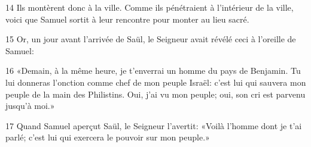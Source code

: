 

14 Ils montèrent donc à la ville. Comme ils pénétraient à l’intérieur de la ville, voici que Samuel sortit à leur rencontre pour monter au lieu sacré.

15 Or, un jour avant l’arrivée de Saül, le Seigneur avait révélé ceci à l’oreille de Samuel:

16 «Demain, à la même heure, je t’enverrai un homme du pays de Benjamin. Tu lui donneras l’onction comme chef de mon peuple Israël: c’est lui qui sauvera mon peuple de la main des Philistins. Oui, j’ai vu mon peuple; oui, son cri est parvenu jusqu’à moi.»

17 Quand Samuel aperçut Saül, le Seigneur l’avertit: «Voilà l’homme dont je t’ai parlé; c’est lui qui exercera le pouvoir sur mon peuple.»